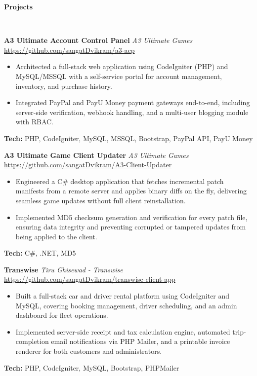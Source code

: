 \documentclass[a4paper,10pt]{article}
\begin{document}
\vspace{0.5pt}
{\large\bfseries Projects}\\[-2pt]
\rule{\linewidth}{0.4pt}\\[2pt]
\textbf{A3 Ultimate Account Control Panel} \quad \textit{A3 Ultimate Games} \hfill \href{https://github.com/sangatDvikram/a3-acp}{\small https://github.com/sangatDvikram/a3-acp}\\[-4pt]
\begin{itemize}[leftmargin=1.5em,itemsep=0pt,parsep=0pt,topsep=0pt,partopsep=0pt]
  \item Architected a full-stack web application using CodeIgniter (PHP) and MySQL/MSSQL with a self-service portal for account management, inventory, and purchase history.
  \item Integrated PayPal and PayU Money payment gateways end-to-end, including server-side verification, webhook handling, and a multi-user blogging module with RBAC.
\end{itemize}
\noindent\textbf{\small Tech:} \small PHP, CodeIgniter, MySQL, MSSQL, Bootstrap, PayPal API, PayU Money
\vspace{3pt}

\textbf{A3 Ultimate Game Client Updater} \quad \textit{A3 Ultimate Games} \hfill \href{https://github.com/sangatDvikram/A3-Client-Updater}{\small https://github.com/sangatDvikram/A3-Client-Updater}\\[-4pt]
\begin{itemize}[leftmargin=1.5em,itemsep=0pt,parsep=0pt,topsep=0pt,partopsep=0pt]
  \item Engineered a C\# desktop application that fetches incremental patch manifests from a remote server and applies binary diffs on the fly, delivering seamless game updates without full client reinstallation.
  \item Implemented MD5 checksum generation and verification for every patch file, ensuring data integrity and preventing corrupted or tampered updates from being applied to the client.
\end{itemize}
\noindent\textbf{\small Tech:} \small C\#, .NET, MD5
\vspace{3pt}

\textbf{Transwise} \quad \textit{Tiru Ghisewad - Transwise} \hfill \href{https://github.com/sangatDvikram/transwise-client-app}{\small https://github.com/sangatDvikram/transwise-client-app}\\[-4pt]
\begin{itemize}[leftmargin=1.5em,itemsep=0pt,parsep=0pt,topsep=0pt,partopsep=0pt]
  \item Built a full-stack car and driver rental platform using CodeIgniter and MySQL, covering booking management, driver scheduling, and an admin dashboard for fleet operations.
  \item Implemented server-side receipt and tax calculation engine, automated trip-completion email notifications via PHP Mailer, and a printable invoice renderer for both customers and administrators.
\end{itemize}
\noindent\textbf{\small Tech:} \small PHP, CodeIgniter, MySQL, Bootstrap, PHPMailer
\vspace{3pt}
\end{document}
